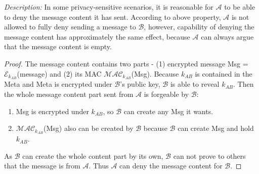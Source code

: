 \bigskip
\noindent
\textit{Description: }In some privacy-sensitive scenarios, it is reasonable for $ \mathcal{A} $ to be able to deny the message content it has sent. According to above property, $ \mathcal{A} $ is not allowed to fully deny sending a message to $ \mathcal{B} $, however, capability of denying the message content has approximately the same effect, because $ \mathcal{A} $ can always argue that the message content is empty.

\bigskip
\begin{proof}
The message content contains two parts - (1) encrypted message Msg =  $\mathcal{E}_{k_{AB}}$(message) and (2) its MAC $\mathcal{MAC}_{k_{AB}}$(Msg). Because $k_{AB}$ is contained in the Meta and Meta is encrypted under $\mathcal{B}$'s public key, $\mathcal{B}$ is able to reveal $k_{AB}$. Then the whole message content part sent from $\mathcal{A}$ is forgeable by $\mathcal{B}$:
\begin{enumerate}
\item Msg is encrypted under $k_{AB}$, so $\mathcal{B}$ can create any Msg it wants.
\item $\mathcal{MAC}_{k_{AB}}$(Msg) also can be created by $\mathcal{B}$ because $\mathcal{B}$ can create Msg and hold $k_{AB}$.
\end{enumerate}
As $\mathcal{B}$ can create the whole content part by its own, $\mathcal{B}$ can not prove to others that the message is from $\mathcal{A}$. Thus $\mathcal{A}$ can deny the message content for $\mathcal{B}$.
\end{proof}
